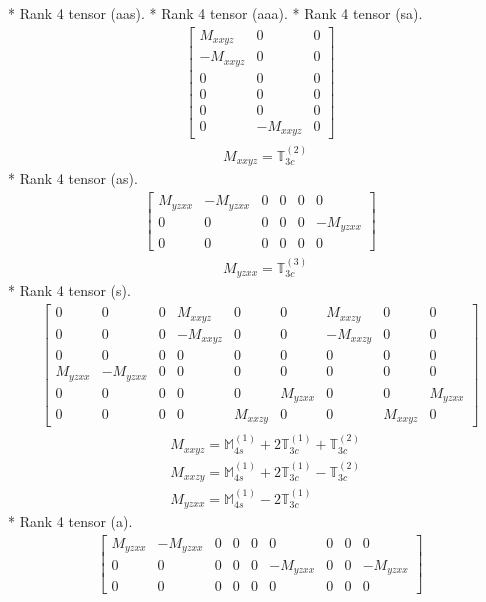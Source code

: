 \documentclass[fleqn,8pt,landscape]{jsarticle}
\begin{document}
* Rank 4 tensor (aas).
* Rank 4 tensor (aaa).
* Rank 4 tensor (sa).
\begin{align*}
\begin{bmatrix} M_{xxyz} & 0 & 0 \\ - M_{xxyz} & 0 & 0 \\ 0 & 0 & 0 \\ 0 & 0 & 0 \\ 0 & 0 & 0 \\ 0 & - M_{xxyz} & 0 \end{bmatrix}
\end{align*}
\begin{align*}
& M_{xxyz} = \mathbb{T}_{3c}^{(2)}
\end{align*}
* Rank 4 tensor (as).
\begin{align*}
\begin{bmatrix} M_{yzxx} & - M_{yzxx} & 0 & 0 & 0 & 0 \\ 0 & 0 & 0 & 0 & 0 & - M_{yzxx} \\ 0 & 0 & 0 & 0 & 0 & 0 \end{bmatrix}
\end{align*}
\begin{align*}
& M_{yzxx} = \mathbb{T}_{3c}^{(3)}
\end{align*}
* Rank 4 tensor (s).
\begin{align*}
\begin{bmatrix} 0 & 0 & 0 & M_{xxyz} & 0 & 0 & M_{xxzy} & 0 & 0 \\ 0 & 0 & 0 & - M_{xxyz} & 0 & 0 & - M_{xxzy} & 0 & 0 \\ 0 & 0 & 0 & 0 & 0 & 0 & 0 & 0 & 0 \\ M_{yzxx} & - M_{yzxx} & 0 & 0 & 0 & 0 & 0 & 0 & 0 \\ 0 & 0 & 0 & 0 & 0 & M_{yzxx} & 0 & 0 & M_{yzxx} \\ 0 & 0 & 0 & 0 & M_{xxzy} & 0 & 0 & M_{xxyz} & 0 \end{bmatrix}
\end{align*}
\begin{align*}
& M_{xxyz} = \mathbb{M}_{4s}^{(1)} + 2 \mathbb{T}_{3c}^{(1)} + \mathbb{T}_{3c}^{(2)} \\
& M_{xxzy} = \mathbb{M}_{4s}^{(1)} + 2 \mathbb{T}_{3c}^{(1)} - \mathbb{T}_{3c}^{(2)} \\
& M_{yzxx} = \mathbb{M}_{4s}^{(1)} - 2 \mathbb{T}_{3c}^{(1)}
\end{align*}
* Rank 4 tensor (a).
\begin{align*}
\begin{bmatrix} M_{yzxx} & - M_{yzxx} & 0 & 0 & 0 & 0 & 0 & 0 & 0 \\ 0 & 0 & 0 & 0 & 0 & - M_{yzxx} & 0 & 0 & - M_{yzxx} \\ 0 & 0 & 0 & 0 & 0 & 0 & 0 & 0 & 0 \end{bmatrix}
\end{align*}
\end{document}
